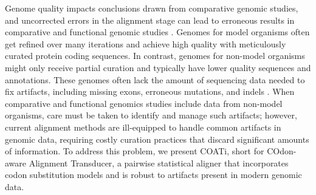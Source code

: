 Genome quality impacts conclusions drawn from comparative genomic studies, and uncorrected errors in the alignment stage can lead to erroneous results in comparative and functional genomic studies .
Genomes for model organisms often get refined over many iterations and achieve high quality with meticulously curated protein coding sequences.
In contrast, genomes for non-model organisms might only receive partial curation and typically have lower quality sequences and annotations.
These genomes often lack the amount of sequencing data needed to fix artifacts, including missing exons, erroneous mutations, and indels .
%
When comparative and functional genomics studies include data from non-model organisms, care must be taken to identify and manage such artifacts; however,
current alignment methods are ill-equipped to handle common artifacts in genomic data, requiring costly curation practices that discard significant amounts of information.
To address this problem, we present COATi, short for COdon-aware Alignment Transducer, a pairwise statistical aligner that incorporates codon substitution models and is robust to artifacts present in modern genomic data.

